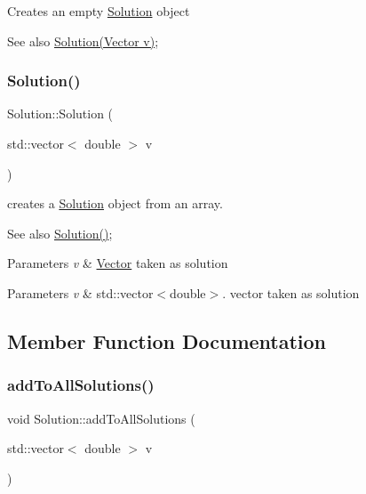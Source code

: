 Creates an empty \hyperlink{class_solution}{Solution} object \begin{DoxySeeAlso}{See also}
\hyperlink{class_solution}{Solution(\+Vector v)}; 
\end{DoxySeeAlso}
\mbox{\label{class_solution_a3a2983c7a229e6d7408471b4dc48fe61}} 
\subsubsection{\texorpdfstring{Solution()}{Solution()}\hspace{0.1cm}{\footnotesize\ttfamily [2/2]}}
{\footnotesize\ttfamily Solution\+::\+Solution (\begin{DoxyParamCaption}\item[{std\+::vector$<$ double $>$}]{v }\end{DoxyParamCaption})}

creates a \hyperlink{class_solution}{Solution} object from an array. \begin{DoxySeeAlso}{See also}
\hyperlink{class_solution_ab55bd4b023d596ce11aaf737b9a6123b}{Solution()}; 
\end{DoxySeeAlso}

\begin{DoxyParams}{Parameters}
{\em v} & \hyperlink{class_vector}{Vector} taken as solution \\
\hline
\end{DoxyParams}

\begin{DoxyParams}{Parameters}
{\em v} & std\+::vector$<$double$>$. vector taken as solution \\
\hline
\end{DoxyParams}


\subsection{Member Function Documentation}
\mbox{\label{class_solution_a0ea58d9480ccb4e344c377f4861e1e7f}} 
\subsubsection{\texorpdfstring{add\+To\+All\+Solutions()}{addToAllSolutions()}}
{\footnotesize\ttfamily void Solution\+::add\+To\+All\+Solutions (\begin{DoxyParamCaption}\item[{std\+::vector$<$ double $>$}]{v }\end{DoxyParamCaption})}

